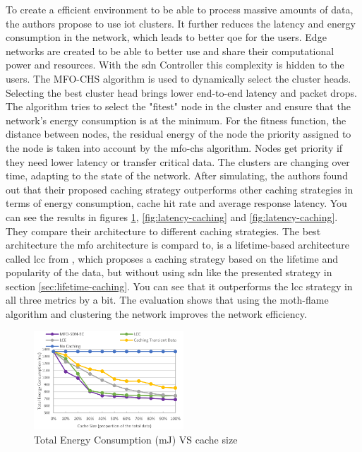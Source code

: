 \documentclass[conference]{IEEEtran}
\begin{document}
	To create a efficient environment to be able to process massive amounts of data, the authors propose to use \ac{iot} clusters. It further reduces the latency and energy consumption in the network, which leads to better \ac{qoe} for the users. Edge networks are created to be able to better use and share their computational power and resources. With the \ac{sdn} Controller this complexity is hidden to the users. The MFO-CHS algorithm is used to dynamically select the cluster heads. Selecting the best cluster head brings lower end-to-end latency and packet drops. The algorithm tries to select the "fitest" node in the cluster and ensure that the network's energy consumption is at the minimum. For the fitness function, the distance between nodes, the residual energy of the node the priority assigned to the node is taken into account by the \ac{mfo-chs} algorithm. Nodes get priority if they need lower latency or transfer critical data. The clusters are changing over time, adapting to the state of the network. After simulating, the authors found out that their proposed caching strategy outperforms other caching strategies in terms of energy consumption, cache hit rate and average response latency. You can see the results in figures \ref{fig:energy-caching}, \ref{fig:latency-caching} and \ref{fig:latency-caching}. They compare their architecture to different caching strategies. The best architecture the \ac{mfo} architecture is compard to, is a lifetime-based architecture called \ac{lcc} from \cite{caching-6}, which proposes a caching strategy based on the lifetime and popularity of the data, but without using \ac{sdn} like the presented strategy \cite{caching-2} in section \ref{sec:lifetime-caching}. You can see that it outperforms the \ac{lcc} strategy in all three metrics by a bit. The evaluation shows that using the moth-flame algorithm and clustering the network improves the network efficiency.

	\begin{figure}
		\centering
		\includegraphics[width=0.5\textwidth]{figures/energy-caching.png}
		\caption{Total Energy Consumption (mJ) VS cache size \cite{caching-1}}
		\label{fig:energy-caching}
	\end{figure}
\end{document}
